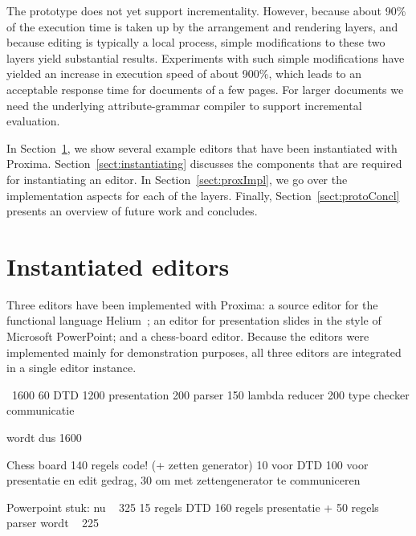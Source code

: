 The prototype does not yet support incrementality. However, because about 90\% 
of the execution time is taken up by the arrangement and rendering layers, and because editing is typically a local process, simple modifications to these two layers yield substantial results. Experiments with such simple modifications have yielded an increase in execution speed of about 900\%,
which leads to an acceptable response time for documents of a few pages. For larger documents we need the underlying attribute-grammar compiler to support incremental evaluation.

In Section~\ref{sect:sampleEditors}, we show several example editors that have been instantiated with Proxima. Section~\ref{sect:instantiating} discusses the components that are required for instantiating an editor. In Section~\ref{sect:proxImpl}, we go over the implementation aspects for each of the layers. Finally, Section~\ref{sect:protoConcl} presents an overview of future work and concludes.

\section{Instantiated editors} \label{sect:sampleEditors}

Three editors have been implemented with Proxima: a source editor for the functional language Helium~\cite{heeren03helium}; an editor for presentation slides in the style of Microsoft PowerPoint; and a chess-board editor. Because the editors were implemented mainly for demonstration purposes, all three editors are integrated in a single editor instance.



\bc
~1600
60   DTD
1200 presentation
200  parser
150  lambda reducer
200  type checker communicatie

wordt dus 1600


Chess board 140 regels code!   (+ zetten generator)
10 voor DTD
100 voor presentatie en edit gedrag, 
30 om met zettengenerator te communiceren


Powerpoint stuk: nu ~ 325     15 regels DTD 160 regels presentatie + 50 regels parser 
wordt ~ 225  
\ec



